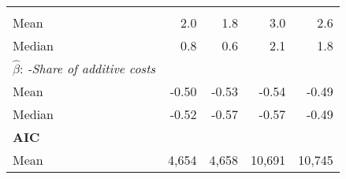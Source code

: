 \begin{tabular}{lllll}
  \multicolumn{1}{|r}{} &
  \multicolumn{1}{r}{} &
  \multicolumn{1}{r}{} &
  \multicolumn{1}{r}{} \\
\multicolumn{1}{l}{\hspace{2em}Mean} &
  \multicolumn{1}{|r}{2.0} &
  \multicolumn{1}{r}{1.8} &
  \multicolumn{1}{r}{3.0} &
  \multicolumn{1}{r}{2.6} \\
\multicolumn{1}{l}{\hspace{2em}Median} &
  \multicolumn{1}{|r}{0.8} &
  \multicolumn{1}{r}{0.6} &
  \multicolumn{1}{r}{2.1} &
  \multicolumn{1}{r}{1.8} \\
\multicolumn{1}{l}{\hspace{1em}$\widehat{\beta}$:  \textit{-Share of additive costs}} &
  \multicolumn{1}{|r}{} &
  \multicolumn{1}{r}{} &
  \multicolumn{1}{r}{} &
  \multicolumn{1}{r}{} \\
\multicolumn{1}{l}{\hspace{2em}Mean} &
  \multicolumn{1}{|r}{-0.50} &
  \multicolumn{1}{r}{-0.53} &
  \multicolumn{1}{r}{-0.54} &
  \multicolumn{1}{r}{-0.49} \\
\multicolumn{1}{l}{\hspace{2em}Median} &
  \multicolumn{1}{|r}{-0.52} &
  \multicolumn{1}{r}{-0.57} &
  \multicolumn{1}{r}{-0.57} &
  \multicolumn{1}{r}{-0.49} \\
\multicolumn{1}{l}{{\textbf{AIC}}} &
  \multicolumn{1}{|r}{} &
  \multicolumn{1}{r}{} &
  \multicolumn{1}{r}{} &
  \multicolumn{1}{r}{} \\
\multicolumn{1}{l}{\hspace{1em}Mean} &
  \multicolumn{1}{|r}{4,654} &
  \multicolumn{1}{r}{4,658} &
  \multicolumn{1}{r}{10,691} &
  \multicolumn{1}{r}{10,745} \\
\cline{1-5}
\end{tabular}
